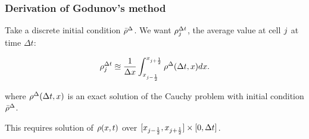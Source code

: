 \begin{frame}
\frametitle{Derivation of Godunov's method}

Take a discrete initial condition $\bar{\rho}^{\Delta}$. We want $\rho_{j}^{\Delta t}$, the average value at cell ${j}$ at time $\Delta t$:

\begin{equation}
\rho_{j}^{\Delta t}\approxeq\dfrac{1}{\Delta x}\int_{x_{j-\frac{1}{2}}}^{x_{j+\frac{1}{2}}}\rho^{\Delta}(\Delta t,x)dx.
\end{equation}

where $\rho^{\Delta}(\Delta t,x)$ is an exact solution of the Cauchy problem
with initial condition $\bar{\rho}^{\Delta}$.



This requires solution of $\rho(x,t)$ over $[x_{j - \frac{1}{2}},x_{j + \frac{1}{2}}]\times [0,\Delta t]$.

\begin{figure}
\centering
{}
\end{figure}

\end{frame}

